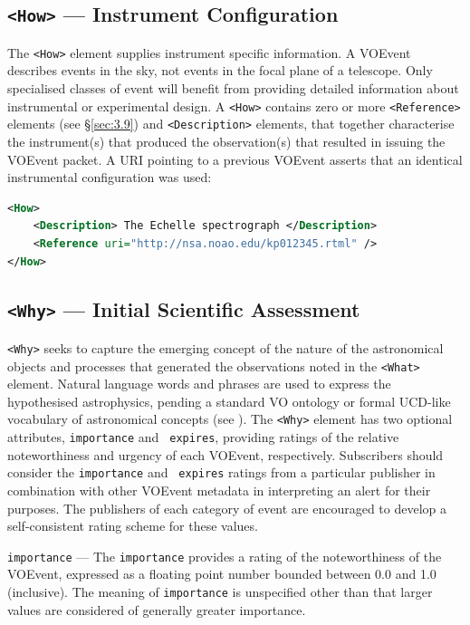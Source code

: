 \documentclass[11pt,a4paper]{ivoa}
\begin{document}
\subsection{{\tt <How>} --- Instrument Configuration}
\label{sec:3.5}
The {\tt <How>} element supplies instrument specific information. A VOEvent 
describes events in the sky, not events in the focal plane of a telescope. Only 
specialised classes of event will benefit from providing detailed information 
about instrumental or experimental design. A {\tt <How>} contains zero or more 
{\tt <Reference>} elements (see \S\ref{sec:3.9}) and {\tt <Description>} 
elements, that together characterise the instrument(s) that produced the 
observation(s) that resulted in issuing the VOEvent packet. A URI pointing to a 
previous VOEvent asserts that an identical instrumental configuration was used: 
\begin{lstlisting}[language=XML]
<How>
    <Description> The Echelle spectrograph </Description>
    <Reference uri="http://nsa.noao.edu/kp012345.rtml" />
</How> 
\end{lstlisting}

\subsection{{\tt <Why>} --- Initial Scientific Assessment}
\label{sec:3.6}
{\tt <Why>} seeks to capture the emerging concept of the nature of the 
astronomical objects and processes that generated the observations noted in the 
{\tt <What>} element. Natural language words and phrases are used to express the 
hypothesised astrophysics, pending a standard VO ontology or formal UCD-like 
vocabulary of astronomical concepts (see \citep{2018ivoa.spec.0527M}).
The {\tt <Why>} element has two optional attributes, {\tt importance} and {\tt 
expires}, providing ratings of the relative noteworthiness and urgency of each 
VOEvent, respectively. Subscribers should consider the {\tt importance} and {\tt
expires} ratings from a particular publisher in combination with other VOEvent 
metadata in interpreting an alert for their purposes. The publishers of each 
category of event are encouraged to develop a self-consistent rating scheme for 
these values. 

 {\tt importance}\label{sec:3.6.1} ---
The {\tt importance} provides a rating of the noteworthiness of the VOEvent, 
expressed as a floating point number bounded between 0.0 and 1.0 (inclusive). 
The meaning of {\tt importance} is unspecified other than that larger values are
considered of generally greater importance. 
\end{document}
